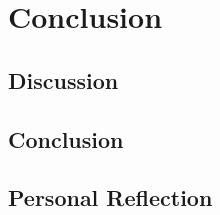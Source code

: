 \chapter{Conclusion}
\label{conclusion}

\section{Discussion}


\section{Conclusion}


\section{Personal Reflection}

